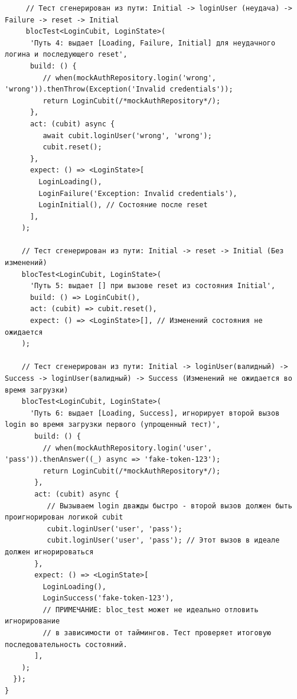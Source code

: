 \documentclass[14pt, russian]{scrartcl}
\begin{document}
\begin{listing}[!htb]
\caption{Пример сгенерированного теста Cubit (Dart, bloc\_test) - продолжение 2}
\begin{verbatim}
     // Тест сгенерирован из пути: Initial -> loginUser (неудача) -> Failure -> reset -> Initial
     blocTest<LoginCubit, LoginState>(
      'Путь 4: выдает [Loading, Failure, Initial] для неудачного логина и последующего reset',
      build: () {
         // when(mockAuthRepository.login('wrong', 'wrong')).thenThrow(Exception('Invalid credentials'));
         return LoginCubit(/*mockAuthRepository*/);
      },
      act: (cubit) async {
         await cubit.loginUser('wrong', 'wrong');
         cubit.reset();
      },
      expect: () => <LoginState>[
        LoginLoading(),
        LoginFailure('Exception: Invalid credentials'),
        LoginInitial(), // Состояние после reset
      ],
    );

    // Тест сгенерирован из пути: Initial -> reset -> Initial (Без изменений)
    blocTest<LoginCubit, LoginState>(
      'Путь 5: выдает [] при вызове reset из состояния Initial',
      build: () => LoginCubit(),
      act: (cubit) => cubit.reset(),
      expect: () => <LoginState>[], // Изменений состояния не ожидается
    );

    // Тест сгенерирован из пути: Initial -> loginUser(валидный) -> Success -> loginUser(валидный) -> Success (Изменений не ожидается во время загрузки)
    blocTest<LoginCubit, LoginState>(
      'Путь 6: выдает [Loading, Success], игнорирует второй вызов login во время загрузки первого (упрощенный тест)',
       build: () {
         // when(mockAuthRepository.login('user', 'pass')).thenAnswer((_) async => 'fake-token-123');
         return LoginCubit(/*mockAuthRepository*/);
       },
       act: (cubit) async {
          // Вызываем login дважды быстро - второй вызов должен быть проигнорирован логикой cubit
          cubit.loginUser('user', 'pass');
          cubit.loginUser('user', 'pass'); // Этот вызов в идеале должен игнорироваться
       },
       expect: () => <LoginState>[
         LoginLoading(),
         LoginSuccess('fake-token-123'),
         // ПРИМЕЧАНИЕ: bloc_test может не идеально отловить игнорирование
         // в зависимости от таймингов. Тест проверяет итоговую последовательность состояний.
       ],
    );
  });
}
\end{verbatim}
\end{listing}
\end{document}
